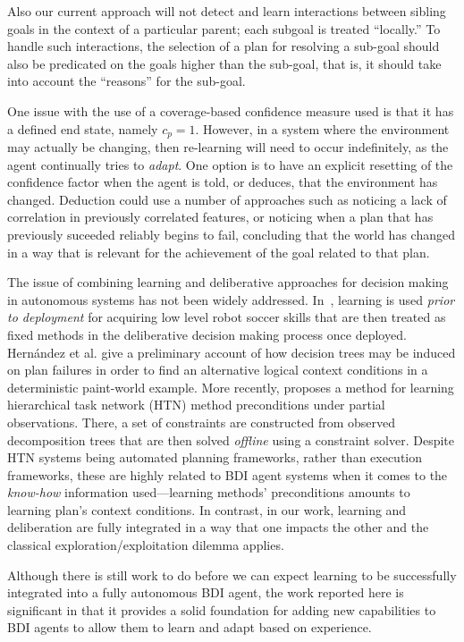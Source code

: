 %
Also our current approach will not detect and learn interactions between
sibling goals in the context of a particular parent; each
subgoal is treated ``locally.'' To handle such interactions, the
selection of a plan for resolving a sub-goal should also be predicated
on the goals higher than the sub-goal, that is, it should take into
account the ``reasons'' for the sub-goal.

One issue with the use of a coverage-based confidence measure used is
that it has a defined end state, namely $c_p=1$. However, in a system
where the environment may actually be changing, then 
re-learning will need to occur indefinitely, as the agent continually tries to
\emph{adapt}. One option is to have an explicit resetting of the
confidence factor when the agent is told, or deduces, that the
environment has changed. Deduction could use a number of approaches
such as noticing a lack of correlation in previously correlated
features, 
or noticing when a plan that has
previously suceeded reliably begins to fail, concluding that the
world has changed in a way that is relevant for the achievement of the
goal related to that plan.

The issue of combining learning and deliberative approaches for decision making
in autonomous systems has not been widely addressed.
In~\cite{Riedmiller01}, learning is used \emph{prior to deployment}
for acquiring low level robot soccer skills that are then treated as
fixed methods in the deliberative decision making process once deployed.
Hern\'andez et al. \cite{Hernandez04:Learning} give a preliminary
account of how decision trees may be induced on plan failures in order
to find an alternative logical context conditions in a deterministic
paint-world example. 
More recently, \cite{Zhuo09:Learning} proposes a method for learning
hierarchical task network (HTN) method preconditions under partial
observations. There, a set of  constraints are constructed from
observed decomposition trees that are then solved \emph{offline} using
a constraint solver. Despite HTN systems being automated planning
frameworks, rather than execution frameworks, these are highly 
related to BDI agent systems when it comes to the \emph{know-how} information
used---learning methods' preconditions amounts to learning plan's context
conditions.
In contrast, in our work, learning and deliberation are fully integrated in a
way that one impacts the other and the classical
exploration/exploitation dilemma applies. 

Although there is still work to do before we can expect learning to be
successfully integrated into a fully autonomous BDI agent, the
work reported here is significant in that it provides a solid
foundation for adding new capabilities to BDI agents to allow them to
learn and adapt based on experience.

